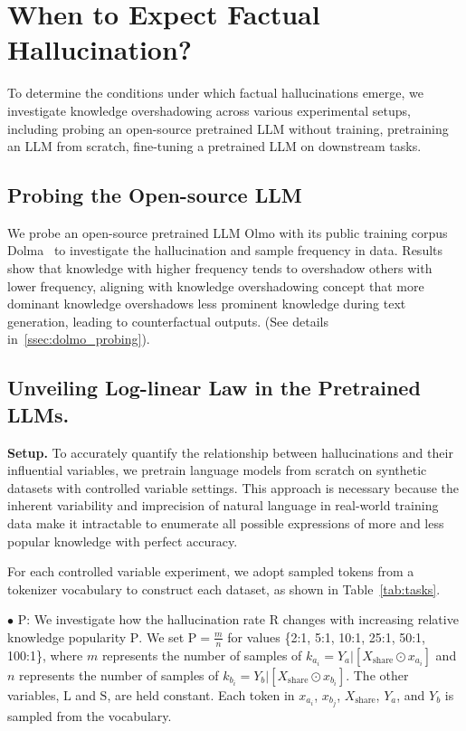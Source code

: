 \section{When to Expect Factual Hallucination?}
\label{sec:when}





To determine the conditions under which factual hallucinations emerge, we investigate knowledge overshadowing across various experimental setups, including probing an open-source pretrained LLM without training, pretraining an LLM from scratch, fine-tuning a pretrained LLM on downstream tasks.

\subsection{Probing the Open-source 
LLM}
\label{ssec:dolma}
We probe an open-source pretrained LLM Olmo with its public training corpus Dolma~\cite{soldaini2024dolma} to investigate the hallucination and sample frequency in data. Results show that knowledge with higher frequency tends to overshadow others with lower frequency, aligning with knowledge overshadowing concept that more dominant knowledge overshadows less prominent knowledge during text generation, leading to counterfactual outputs. (See details in~\ref{ssec:dolmo_probing}). 

\subsection{Unveiling Log-linear Law in the Pretrained LLMs.}
\label{ssec:pretrain_law}

\noindent \textbf{Setup.}
To accurately quantify the relationship between hallucinations and their influential variables, we pretrain language models from scratch on synthetic datasets with controlled variable settings. This approach is necessary because the inherent variability and imprecision of natural language in real-world training data make it intractable to enumerate all possible expressions of more and less popular knowledge with perfect accuracy.


For each controlled variable experiment, we adopt sampled tokens from a tokenizer vocabulary to construct each dataset, as shown in Table~\ref{tab:tasks}.


\noindent$\bullet$ P: We investigate how the hallucination rate $\text{R}$ changes with increasing relative knowledge popularity $\text{P}$. We set $\text{P} = \frac{m}{n}$ for values \{2:1, 5:1, 10:1, 25:1, 50:1, 100:1\}, where $m$ represents the number of samples of $k_{a_i} = Y_a | [X_{\mathrm{share}} \odot x_{a_i}]$ and $n$ represents the number of samples of $k_{b_i} = Y_b | [X_{\mathrm{share}} \odot x_{b_i}]$. The other variables, $\text{L}$ and $\text{S}$, are held constant. Each token in $x_{a_i}$, $x_{b_j}$, $X_\mathrm{share}$, $Y_a$, and $Y_b$ is sampled from the vocabulary.

